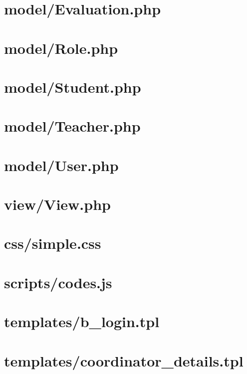 \section{model/Evaluation.php}

\section{model/Role.php}

\section{model/Student.php}

\section{model/Teacher.php}

\section{model/User.php}


\section{view/View.php}


\section{css/simple.css}


\section{scripts/codes.js}


\section{templates/b\_login.tpl}

\section{templates/coordinator\_details.tpl}

